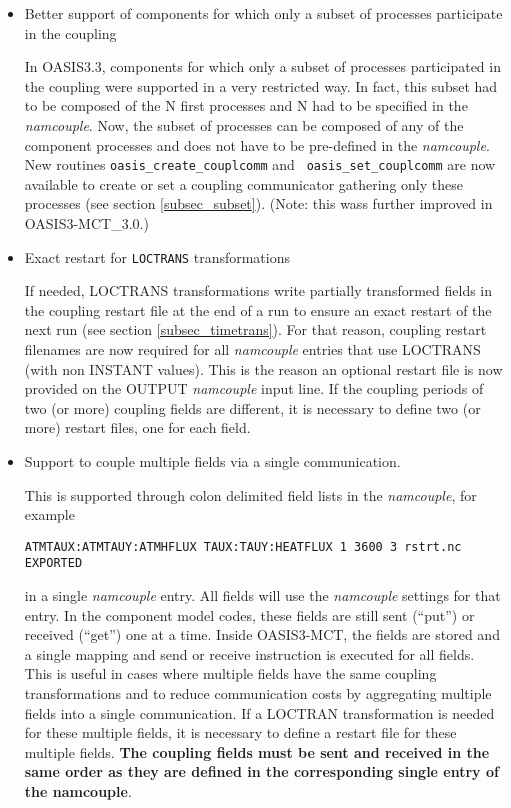 \begin{itemize}

\item Better support of components for which only a subset of processes
  participate in the coupling

In OASIS3.3, components for which only a subset of processes
  participated in the coupling were supported in a very restricted
  way. In fact, this subset had to be composed of the N first
  processes and N had to be specified in the {\it namcouple}. Now, the
  subset of processes can be composed of any of the component
  processes and does not have to be pre-defined in the {\it
    namcouple}. New routines {\tt oasis\_create\_couplcomm} and {\tt
  oasis\_set\_couplcomm} are now available to create or set a coupling
  communicator gathering only these processes (see section \ref{subsec_subset}). (Note: this wass further improved in OASIS3-MCT\_3.0.)

\item Exact restart for {\tt LOCTRANS} transformations

If needed, LOCTRANS transformations write partially
  transformed fields  in the coupling restart file at the end of a run
  to ensure an exact restart of the next run (see section
  \ref{subsec_timetrans}). For that
  reason, coupling restart filenames are now required for all {\it
    namcouple} entries that use LOCTRANS (with non INSTANT
  values). This is the reason an optional restart file is now provided
  on the OUTPUT {\it namcouple} input line. If the coupling periods of
  two (or more) coupling fields are different, it is necessary to define 
  two (or more) restart files, one for each field.

\item Support to couple multiple fields via a single communication.

 This is supported through colon
delimited field lists in the {\it namcouple}, for example 

{\tt ATMTAUX:ATMTAUY:ATMHFLUX  TAUX:TAUY:HEATFLUX 1 3600 3 rstrt.nc EXPORTED}

 in a single {\it namcouple} entry. All fields will use the
{\it namcouple} settings for that entry. In the component model codes,
these fields are still sent (``put'') or received (``get'') one at a
time. Inside OASIS3-MCT, the fields are stored and a single mapping
and send or receive instruction is executed for all fields. This is
useful in cases where multiple fields have the same coupling
transformations and to reduce communication costs by aggregating multiple 
fields into a single communication. If a LOCTRAN transformation is needed
for these multiple fields, it is necessary to define a restart file for 
these multiple fields. {\bf The coupling fields must be sent and received in the same order 
as they are defined in the corresponding single entry of the namcouple}.


\end{itemize}
